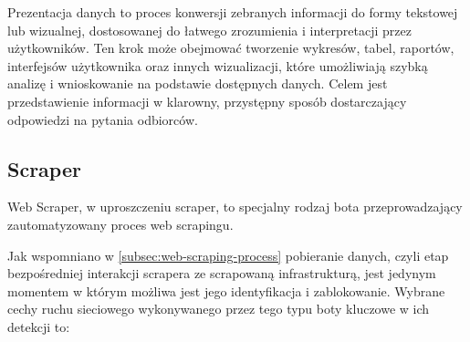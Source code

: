 Prezentacja danych to proces konwersji zebranych informacji do formy tekstowej lub wizualnej, dostosowanej do łatwego zrozumienia i interpretacji przez użytkowników.
Ten krok może obejmować tworzenie wykresów, tabel, raportów, interfejsów użytkownika oraz innych wizualizacji, które umożliwiają szybką analizę i wnioskowanie na podstawie dostępnych danych.
Celem jest przedstawienie informacji w klarowny, przystępny sposób dostarczający odpowiedzi na pytania odbiorców.

\subsection{Scraper}\label{subsec:scraper}

Web Scraper, w uproszczeniu scraper, to specjalny rodzaj bota przeprowadzający zautomatyzowany proces web scrapingu.

Jak wspomniano w \autoref{subsec:web-scraping-process} pobieranie danych, czyli etap bezpośredniej interakcji scrapera ze scrapowaną infrastrukturą,
jest jedynym momentem w którym możliwa jest jego identyfikacja i zablokowanie.
Wybrane cechy ruchu sieciowego wykonywanego przez tego typu boty kluczowe w ich detekcji to:

